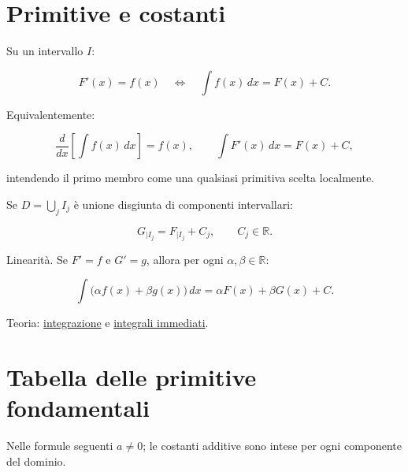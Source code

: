 \section{Primitive e costanti}\label{primitive-e-costanti}

Su un intervallo \(I\):

\[
\displaystyle
F'(x)=f(x)
\quad\Longleftrightarrow\quad
\int f(x)\,dx=F(x)+C.
\]

Equivalentemente:

\[
\frac{d}{dx}\left[\int f(x)\,dx\right]=f(x),
\qquad
\int F'(x)\,dx=F(x)+C,
\]

intendendo il primo membro come una qualsiasi primitiva scelta localmente.

Se \(D=\bigcup_j I_j\) è unione disgiunta di componenti intervallari:

\[
\displaystyle
G_{\mid I_j}=F_{\mid I_j}+C_j,
\qquad C_j\in\mathbb R.
\]

Linearità. Se \(F'=f\) e \(G'=g\), allora per ogni \(\alpha,\beta\in\mathbb R\):

\[
\displaystyle
\int\bigl(\alpha f(x)+\beta g(x)\bigr)\,dx
=
\alpha F(x)+\beta G(x)+C.
\]

Teoria: \href{https://ingegnerismo.it/matematica/integrazione/}{integrazione} e \href{https://ingegnerismo.it/matematica/integrali-immediati/}{integrali immediati}.

\section{Tabella delle primitive fondamentali}\label{tabella-delle-primitive-fondamentali}

Nelle formule seguenti \(a\ne0\); le costanti additive sono intese per ogni componente del dominio.

